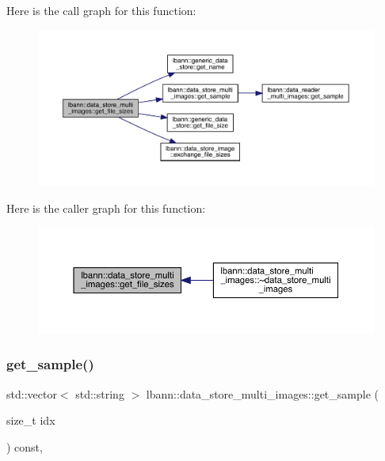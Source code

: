 Here is the call graph for this function\+:\nopagebreak
\begin{figure}[H]
\begin{center}
\leavevmode
\includegraphics[width=350pt]{classlbann_1_1data__store__multi__images_a25963dfa7d6de983e7b250f8ef7e2a0e_cgraph}
\end{center}
\end{figure}
Here is the caller graph for this function\+:\nopagebreak
\begin{figure}[H]
\begin{center}
\leavevmode
\includegraphics[width=350pt]{classlbann_1_1data__store__multi__images_a25963dfa7d6de983e7b250f8ef7e2a0e_icgraph}
\end{center}
\end{figure}
\mbox{\label{classlbann_1_1data__store__multi__images_a39108690484fe407efafefe6a4b0947b}} 
\subsubsection{\texorpdfstring{get\+\_\+sample()}{get\_sample()}}
{\footnotesize\ttfamily std\+::vector$<$ std\+::string $>$ lbann\+::data\+\_\+store\+\_\+multi\+\_\+images\+::get\+\_\+sample (\begin{DoxyParamCaption}\item[{size\+\_\+t}]{idx }\end{DoxyParamCaption}) const\hspace{0.3cm}{\ttfamily [protected]}, {\ttfamily [virtual]}}



